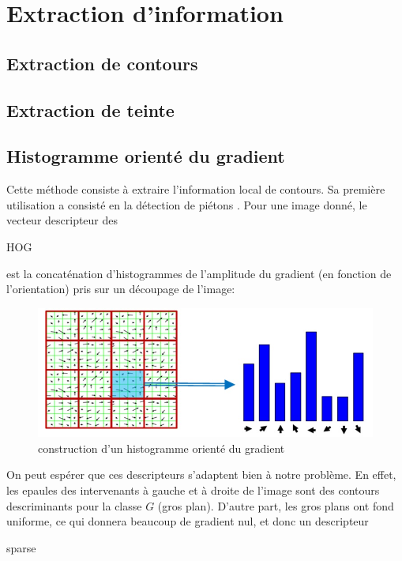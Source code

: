\documentclass{book}
\begin{document}
\chapter{Extraction d'information}
\section{Extraction de contours}
\section{Extraction de teinte}
\section{Histogramme orienté du gradient}

Cette méthode consiste à extraire l'information local de contours. Sa première utilisation a consisté en 
la détection de piétons \cite{hog}. Pour une image donné, le vecteur descripteur des \begin{itshape}HOG\end{itshape} est la concaténation
d'histogrammes de l'amplitude du gradient (en fonction de l'orientation) pris sur un découpage de l'image:
\begin{figure}[H]
\begin{center}
\includegraphics[scale=0.5]{hog.jpg}
\end{center}
\caption{construction d'un histogramme orienté du gradient \cite{hog2}}
\label{hog}
\end{figure}

On peut espérer que ces descripteurs s'adaptent bien à notre problème. En effet, les epaules des intervenants à gauche 
et à droite de l'image sont des contours descriminants pour la classe $G$ (gros plan). D'autre part, les gros plans ont fond uniforme, 
ce qui donnera beaucoup de gradient nul, et donc un descripteur \begin{itshape}sparse\end{itshape}
\end{document}
